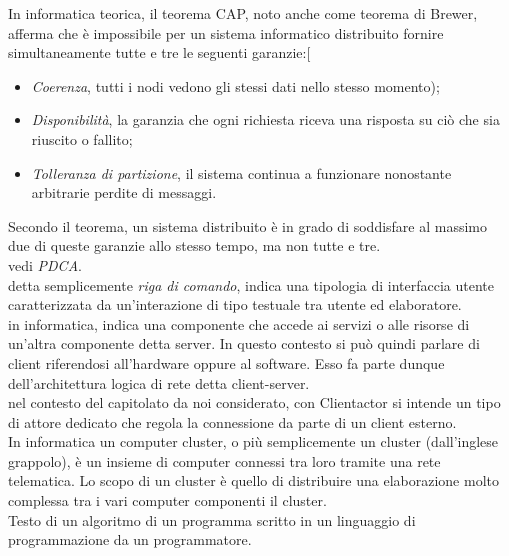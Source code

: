 \documentclass{scalatekids-article}
\begin{document}
 In informatica teorica, il teorema CAP, noto anche come teorema di Brewer, afferma che è impossibile per un sistema informatico distribuito fornire simultaneamente tutte e tre le seguenti garanzie:[
\begin{itemize}
	\item \textit{Coerenza}, tutti i nodi vedono gli stessi dati nello stesso momento);
	\item \textit{Disponibilità}, la garanzia che ogni richiesta riceva una risposta su ciò che sia riuscito o fallito;
	\item \textit{Tolleranza di partizione}, il sistema continua a funzionare nonostante arbitrarie perdite di messaggi.
\end{itemize}
Secondo il teorema, un sistema distribuito è in grado di soddisfare al massimo due di queste garanzie allo stesso tempo, ma non tutte e tre.
\\

 vedi \textit{PDCA}.
\\

 detta semplicemente \textit{riga di comando}, indica una tipologia di interfaccia utente caratterizzata da un'interazione di tipo testuale tra utente ed elaboratore.
\\

 in informatica, indica una componente che accede ai servizi o alle risorse di un'altra componente detta server. In questo contesto si può quindi parlare di client riferendosi all'hardware oppure al software. Esso fa parte dunque dell'architettura logica di rete detta client-server.
\\

 nel contesto del capitolato da noi considerato, con Clientactor si intende un tipo di attore dedicato che regola la connessione da parte di un client esterno. 
\\

 In informatica un computer cluster, o più semplicemente un cluster (dall'inglese grappolo), è un insieme di computer connessi tra loro tramite una rete telematica. Lo scopo di un cluster è quello di distribuire una elaborazione molto complessa tra i vari computer componenti il cluster. 
\\

 Testo di un algoritmo di un programma scritto in un linguaggio di programmazione da un programmatore.
\\
\end{document}
